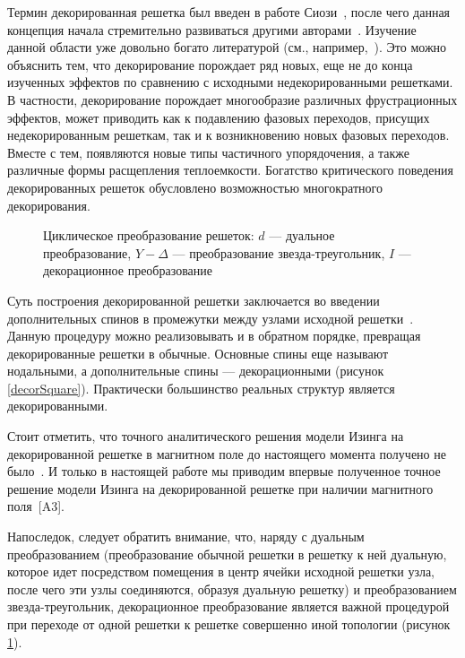 Термин \guillemotleft декорированная решетка\guillemotright \hspace{1pt} был введен в работе Сиози~\cite{siozi1951}, после чего данная концепция начала стремительно развиваться другими авторами~\cite{siozi_domb1972, fisher1958}. Изучение данной области уже довольно богато литературой (см., например,~\cite{jaščur2016, strečka2019_1, strečka2019_2, gálisová2018, cenčariková2016, stubňa2017, mutalamov2020}). Это можно объяснить тем, что декорирование порождает ряд новых, еще не до конца изученных эффектов по сравнению с исходными недекорированными решетками. В частности, декорирование порождает многообразие различных фрустрационных эффектов, может приводить как к подавлению фазовых переходов, присущих недекорированным решеткам, так и к возникновению новых фазовых переходов. Вместе с тем, появляются новые типы частичного упорядочения, а также различные формы расщепления теплоемкости. Богатство критического поведения декорированных решеток обусловлено возможностью многократного декорирования.

\begin{figure}[h]
	\caption{Циклическое преобразование решеток: $d$ --- дуальное преобразование, $Y - \Delta$ --- преобразование \guillemotleft звезда-треугольник\guillemotright \hspace{1pt}, $I$ --- декорационное преобразование~\cite{siozi_domb1972}}
	\label{transformCycle}
\end{figure}

Суть построения декорированной решетки заключается во введении дополнительных спинов в промежутки между узлами исходной решетки~\cite{siozi_domb1972}. Данную процедуру можно реализовывать и в обратном порядке, превращая декорированные решетки в обычные. Основные спины еще называют нодальными, а дополнительные спины --- декорационными (рисунок \ref{decorSquare}). Практически большинство реальных структур является декорированными.

Стоит отметить, что точного аналитического решения модели Изинга на декорированной решетке в магнитном поле до настоящего момента получено не было~\cite{kassan-ogly2019, proshkin2019, kassan-ogly2020}. И только в настоящей работе мы приводим впервые полученное точное решение модели Изинга на декорированной решетке при наличии магнитного поля~[A3].

Напоследок, следует обратить внимание, что, наряду с дуальным преобразованием (преобразование обычной решетки в решетку к ней дуальную, которое идет посредством помещения в центр ячейки исходной решетки узла, после чего эти узлы соединяются, образуя дуальную решетку) и преобразованием \guillemotleft звезда-треугольник\guillemotright \hspace{1pt}, декорационное преобразование является важной процедурой при переходе от одной решетки к решетке совершенно иной топологии (рисунок \ref{transformCycle}).

